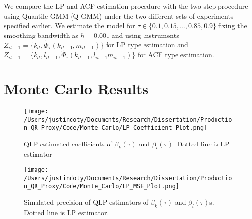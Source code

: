 \documentclass[11pt]{article}
\begin{document}
We compare the LP and ACF estimation procedure with the two-step procedure using Quantile GMM (Q-GMM) under  the two different sets of experiments specified earlier. We estimate the model for $\tau\in\{0.1, 0.15, \dots, 0.85, 0.9\}$ fixing the smoothing bandwidth as $h=0.001$ and using instruments $Z_{it-1}=\{k_{it}, \tilde{\Phi}_{\tau}(k_{it-1}, m_{it-1})\}$ for LP type estimation and $Z_{it-1}=\{k_{it}, l_{it-1}, \tilde{\Phi}_{\tau}(k_{it-1}, l_{it-1} m_{it-1})\}$ for ACF type estimation.
 

\section{Monte Carlo Results} \label{montecarlo}



\begin{figure}[H]
\centering
\caption{QLP estimated coefficients of  $\beta_{k}(\tau)$ and $\beta_{l}(\tau)$. Dotted line is LP estimator}
\texttt{[image: /Users/justindoty/Documents/Research/Dissertation/Production\_QR\_Proxy/Code/Monte\_Carlo/LP\_Coefficient\_Plot.png]}
\label{LP_coefficient_plot}
\end{figure}


\begin{figure}[H]
\centering
\caption{Simulated precision of  QLP estimators of $\beta_{k}(\tau)$ and $\beta_{l}(\tau)$s. Dotted line is LP estimator.}
\texttt{[image: /Users/justindoty/Documents/Research/Dissertation/Production\_QR\_Proxy/Code/Monte\_Carlo/LP\_MSE\_Plot.png]}
\label{MSE_plot}
\end{figure}
\end{document}
